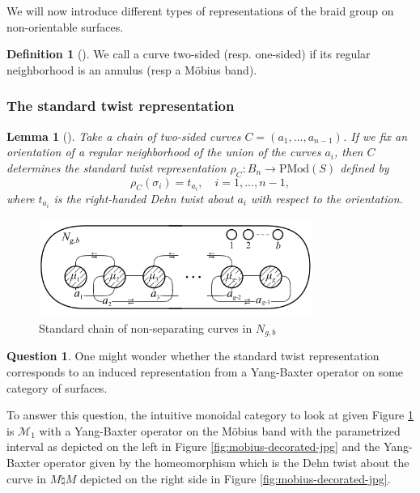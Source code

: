 \documentclass[reqno]{amsart}
\newtheorem{lemma}[theorem]{Lemma}
\theoremstyle{definition}
\newtheorem{definition}[theorem]{Definition}
\newtheorem{question}[theorem]{Question}
\theoremstyle{remark}
\newcommand{\PMod}{{\mathrm{PMod}}}
\begin{document}
We will now introduce different types of representations
of the braid group on non-orientable surfaces.


\begin{definition}[]
We call a curve two-sided (resp. one-sided) if its regular neighborhood is an
annulus (resp a Möbius band).
\end{definition}

\subsubsection{The standard twist representation}

\begin{lemma}[]
    Take a chain of two-sided curves
    $C = \left( a_1, \ldots, a_{n-1} \right) $.
    If we fix an orientation of a regular neighborhood
    of the union of the curves $a_i$, then
    $C$ determines \textit{the standard twist representation}
    $\rho_{C} \colon B_n \to \PMod (S)$ defined by
    \[
    \rho_C \left( \sigma_i \right) = t_{a_i}, \quad
    i = 1, \ldots, n-1,
    \] 
    where $t_{a_i}$ is the right-handed Dehn twist
    about $a_i$ with respect to the orientation.
\end{lemma}

\begin{figure}[H]
    \centering
    \includegraphics[width=0.8\textwidth]{standard-chain.png}
    \caption{Standard chain of non-separating curves
    in $N_{g,b}$}
    \label{fig:standard-chain-png}
\end{figure}

\begin{question}
    One might wonder whether the standard twist representation
    corresponds to an induced representation from a Yang-Baxter
    operator on some category of surfaces.
\end{question}

To answer this question, the intuitive monoidal category to
look at given Figure \ref{fig:standard-chain-png} is
$\mathcal{M}_1$ with a Yang-Baxter operator
on the Möbius band with the parametrized interval
as depicted on the left in Figure \ref{fig:mobius-decorated-jpg}
and the Yang-Baxter operator given by
the homeomorphism which is the Dehn twist about the curve in
$M \natural M$ depicted on the right side in Figure
\ref{fig:mobius-decorated-jpg}.
\end{document}
